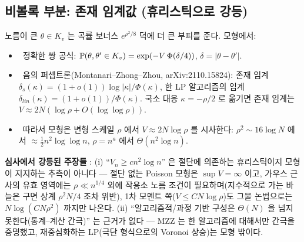 \subsection{비볼록 부분: 존재 임계값 (휴리스틱으로 강등)}
노름이 큰 $\theta\in K_v$ 는 곡률 보너스 $e^{\rho^2/8}$ 덕에 더 큰 부피를 준다. 모형에서:
\begin{itemize}
\item \tagM\ 정확한 쌍 공식: $\P(\theta,\theta'\in K_v)=\exp(-V\,\Phi(\delta/4))$, $\delta=|\theta-\theta'|$.
\item \tagL\ 음의 퍼셉트론(Montanari--Zhong--Zhou, arXiv:2110.15824): 존재 임계 $\delta_s(\kappa)=(1+o(1))\log|\kappa|/\Phi(\kappa)$, 한 LP 알고리즘의 임계 $\delta_{lin}(\kappa)=(1+o(1))/\Phi(\kappa)$. 국소 대응 $\kappa=-\rho/2$ 로 옮기면 존재 임계는 $V\approx2N(\log\rho+O(\log\log\rho))$.
\item \tagH\ 따라서 모형은 변형 스케일 $\rho$ 에서 $V\approx2N\log\rho$ 를 시사한다: $\rho^2\sim16\log N$ 에서 $\approx\tfrac12n^2\log\log n$, $\rho=n^a$ 에서 $\Theta(n^2\log n)$.
\end{itemize}
\textbf{심사에서 강등된 주장들} \tagF: (i) ``$V_n\ge cn^2\log n$'' 은 절단에 의존하는 휴리스틱이지 모형이 지지하는 추측이 아니다 --- 절단 없는 Poisson 모형은 $\sup V=\infty$ 이고, 가우스 근사의 유효 영역에는 $\rho\ll n^{1/4}$ 외에 작용소 노름 조건이 필요하며(지수적으로 가는 바늘은 구면 상계 $\rho^2N/4$ 조차 위반), 1차 모멘트 쪽($V\le CN\log\rho$)도 그물 논법으로는 $N\log(CN\rho^2)$ 까지만 나온다. (ii) ``알고리즘적/과정 기반 구성은 $\Theta(N)$ 을 넘지 못한다(통계--계산 간극)'' 는 근거가 없다 --- MZZ 는 한 알고리즘에 대해서만 간극을 증명했고, 재중심화하는 LP(극단 형식으로의 Voronoi 상승)는 모형 밖이다.

